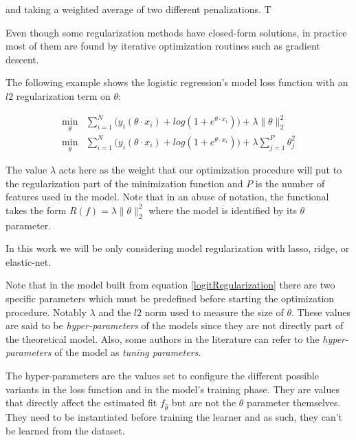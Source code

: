 and taking a weighted average of two different penalizations. T

Even though some regularization methods have closed-form solutions, in practice most of them are found by iterative optimization routines such as gradient descent.

The following example shows the logistic regression's model loss function with an $l2$ regularization term on $\theta$:

\begin{equation} \label{logitRegularization}
\begin{split}
\min_{\theta} &  \sum_{i=1}^N \big(y_i ( \theta \cdot x_i ) + log(1 + e^{\theta \cdot x_i} ) \big)  +  \lambda \| \theta\|_{2}^2 \\
\min_{\theta} &  \sum_{i=1}^N \big(y_i ( \theta \cdot x_i ) + log(1 + e^{\theta \cdot x_i} ) \big) +  \lambda \sum_{j=1}^P  \theta_j^2
\end{split}
\end{equation}


%


The value $\lambda$ acts here as the weight that our optimization procedure will put to the regularization part of the minimization function and $P$  is the number of features used in the model. Note that in an abuse of notation, the functional takes the form  $R(f) = \lambda\| \theta\|_{2}^2$ where the model is identified by its $\theta$ parameter.

In this work we will be only considering model regularization with lasso, ridge, or elastic-net.

Note that in the model built from equation \ref{logitRegularization} there are two specific parameters which must be predefined before starting the optimization procedure. Notably  $\lambda$ and the $l2$ norm used to measure the size of $\theta$. These values are said to be \textit{hyper-parameters} of the models since they are not directly part of the theoretical model. Also, some authors in the literature can refer to the \textit{hyper-parameters} of the model as \textit{tuning parameters}.

The hyper-parameters are the values set to configure the different possible variants in the loss function and in the model's training phase.  They are values that directly affect the estimated fit $f_{\hat{\theta}}$ but are not the $\theta$ parameter themselves.  They need to be instantiated before training the learner and as such, they can't be learned from the dataset.

